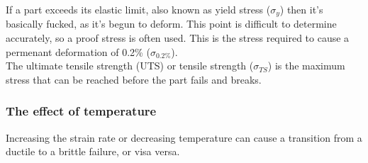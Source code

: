 \documentclass[10pt,a4paper]{article}
\begin{document}
		If a part exceeds its elastic limit, also known as yield stress ($\sigma_y$) then it's basically fucked, as it's begun to deform. This point is difficult to determine accurately, so a proof stress is often used. This is the stress required to cause a permenant deformation of 0.2\% ($\sigma_{0.2\%}$). \\
		The ultimate tensile strength (UTS) or tensile strength ($\sigma_{TS}$) is the maximum stress that can be reached before the part fails and breaks. 
		\subsubsection{The effect of temperature}
			Increasing the strain rate or decreasing temperature can cause a transition from a ductile to a brittle failure, or visa versa.
\end{document}
